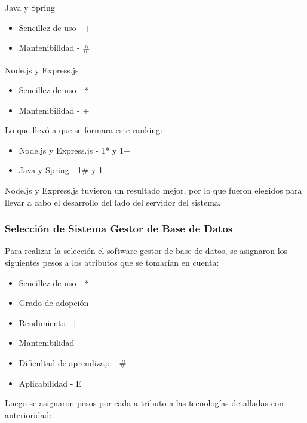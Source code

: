 \documentclass{article}
\begin{document}
Java y Spring
\begin{itemize}
    \item Sencillez de uso - +
    \item Mantenibilidad - \#
\end{itemize}
Node.js\textsuperscript{\textregistered} y Express.js
\begin{itemize}
    \item Sencillez de uso - *
    \item Mantenibilidad - +
\end{itemize}
Lo que llevó a que se formara este ranking:
\begin{itemize}
    \item Node.js y Express.js - 1* y 1+
    \item Java y Spring - 1\# y 1+
\end{itemize}
Node.js y Express.js tuvieron un resultado mejor, por lo que fueron elegidos para llevar a cabo el desarrollo del lado del servidor del sistema.
\subsubsection{Selección de Sistema Gestor de Base de Datos}
Para realizar la selección el software gestor de base de datos, se asignaron los siguientes pesos a los atributos que se tomarían en cuenta:
\begin{itemize}
    \item Sencillez de uso - *
    \item Grado de adopción - +
    \item Rendimiento - |
    \item Mantenibilidad - |
    \item Dificultad de aprendizaje - \#
    \item Aplicabilidad - E
\end{itemize}
Luego se asignaron pesos por cada a tributo a las tecnologías detalladas con anterioridad:
\end{document}
